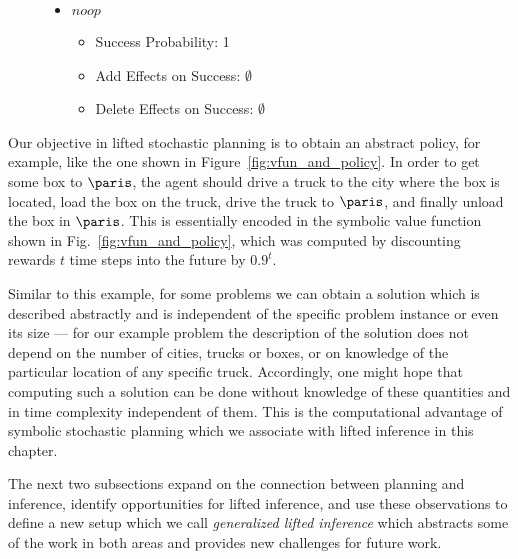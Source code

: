 \begin{figure}[t!]
\begin{center}
{\begin{minipage}{\columnwidth}
{\begin{itemize}
\begin{itemize}
\begin{itemize}
    \item Add Effects on Success: $\{ \TIn(T,C_2) \}$
    \item Delete Effects on Success: $\{ \TIn(T,C_1) \}$
    \end{itemize}
  \item $noop$
    \begin{itemize} \denselist
    \item Success Probability: 1
    \item Add Effects on Success: $\emptyset$
    \item Delete Effects on Success: $\emptyset$
    \end{itemize}
  \end{itemize}
\end{itemize}}
\end{minipage}}
\end{center}
\end{figure}
%

Our objective in lifted stochastic planning is to obtain an
abstract policy, for example, like the one shown in Figure~\ref{fig:vfun_and_policy}.
In order to get some box to $\paris$, the agent should drive a truck
to the city where the box is located, load the box on the truck, drive
the truck to $\paris$, and finally unload the box in $\paris$.  This
is essentially encoded in the symbolic value function shown in
Fig.~\ref{fig:vfun_and_policy}, which was computed by discounting rewards
$t$ time steps into the future by $0.9^t$.

Similar to this example,
for some problems we can obtain a solution which is
described abstractly and is independent of the specific problem
instance or even its size --- for our example problem the description of
the solution does not depend on the number of cities, trucks or boxes, or
on  knowledge of the particular location of any specific truck.
Accordingly, one might hope that computing such a solution can be done without knowledge of these quantities and in time complexity independent of them.
This is the computational advantage of symbolic stochastic planning
which we associate with lifted inference in this chapter. 

The next two subsections expand on the connection between planning and inference, identify opportunities for lifted inference, and use these observations to define a new setup which we call {\em generalized lifted inference} which abstracts some of the work in both areas and provides new challenges for future work. 


